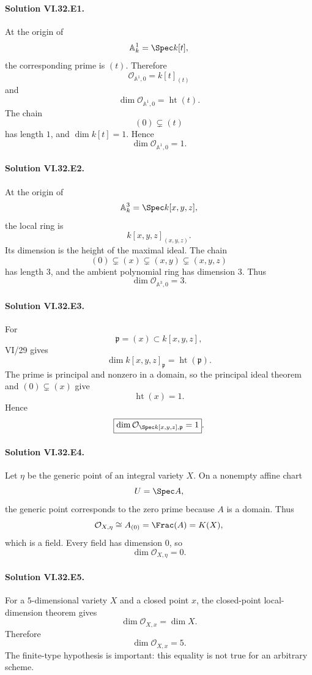 
\paragraph{Solution VI.32.E1.}
At the origin of
\[
\mathbb A^1_k=\Spec k[t],
\]
the corresponding prime is \((t)\).  Therefore
\[
\mathcal O_{\mathbb A^1,0}=k[t]_{(t)}
\]
and
\[
\dim\mathcal O_{\mathbb A^1,0}
=
\operatorname{ht}(t).
\]
The chain
\[
(0)\subsetneq(t)
\]
has length \(1\), and \(\dim k[t]=1\). Hence
\[
\boxed{\dim\mathcal O_{\mathbb A^1,0}=1}.
\]

\paragraph{Solution VI.32.E2.}
At the origin of
\[
\mathbb A^3_k=\Spec k[x,y,z],
\]
the local ring is
\[
k[x,y,z]_{(x,y,z)}.
\]
Its dimension is the height of the maximal ideal.  The chain
\[
(0)\subsetneq(x)\subsetneq(x,y)\subsetneq(x,y,z)
\]
has length \(3\), and the ambient polynomial ring has dimension \(3\). Thus
\[
\boxed{\dim\mathcal O_{\mathbb A^3,0}=3}.
\]

\paragraph{Solution VI.32.E3.}
For
\[
\mathfrak p=(x)\subset k[x,y,z],
\]
VI/29 gives
\[
\dim k[x,y,z]_{\mathfrak p}
=
\operatorname{ht}(\mathfrak p).
\]
The prime is principal and nonzero in a domain, so the principal ideal theorem and
\((0)\subsetneq(x)\) give
\[
\operatorname{ht}(x)=1.
\]
Hence
\[
\boxed{\dim\mathcal O_{\Spec k[x,y,z],\mathfrak p}=1}.
\]

\paragraph{Solution VI.32.E4.}
Let \(\eta\) be the generic point of an integral variety \(X\).  On a nonempty affine chart
\[
U=\Spec A,
\]
the generic point corresponds to the zero prime because \(A\) is a domain.  Thus
\[
\mathcal O_{X,\eta}\cong A_{(0)}=\Frac(A)=K(X),
\]
which is a field.  Every field has dimension \(0\), so
\[
\boxed{\dim\mathcal O_{X,\eta}=0}.
\]

\paragraph{Solution VI.32.E5.}
For a \(5\)-dimensional variety \(X\) and a closed point \(x\), the closed-point local-dimension theorem gives
\[
\dim\mathcal O_{X,x}=\dim X.
\]
Therefore
\[
\boxed{\dim\mathcal O_{X,x}=5}.
\]
The finite-type hypothesis is important: this equality is not true for an arbitrary scheme.

